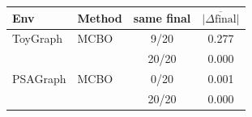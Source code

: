 \begin{tabular}{@{}llcc@{}}
\toprule
\textbf{Env} & \textbf{Method} & \textbf{same final} & $\overline{|\Delta \text{final}|}$ \\
\midrule
ToyGraph & MCBO & 9/20 & 0.277 \\
 & \QMCBO{} & 20/20 & 0.000 \\
\addlinespace[2pt]
PSAGraph & MCBO & 0/20 & 0.001 \\
 & \QMCBO{} & 20/20 & 0.000 \\
\bottomrule
\end{tabular}
